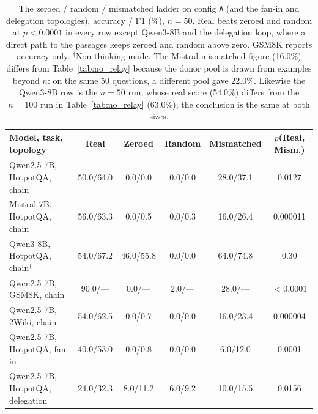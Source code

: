\documentclass[11pt]{article}
\begin{document}
\begin{table}[h]
\centering
\small
\caption{The zeroed / random / mismatched ladder on config \texttt{A} (and the
fan-in and delegation topologies), accuracy / F1 (\%), $n{=}50$. Real beats
zeroed and random at $p<0.0001$ in every row except Qwen3-8B and the
delegation loop, where a direct path to the passages keeps zeroed and random
above zero. GSM8K reports accuracy only. $^\dagger$Non-thinking mode. The Mistral
mismatched figure (16.0\%) differs from Table~\ref{tab:no_relay} because the donor
pool is drawn from examples beyond $n$: on the same 50 questions, a different pool
gave 22.0\%. Likewise the Qwen3-8B row is the $n{=}50$ run, whose real score
(54.0\%) differs from the $n{=}100$ run in Table~\ref{tab:no_relay} (63.0\%); the
conclusion is the same at both sizes.}
\label{tab:ladder}
\begin{tabular}{lccccc}
\toprule
\textbf{Model, task, topology} & \textcolor{realblue}{\textbf{Real}} & \textbf{Zeroed} & \textbf{Random} & \textcolor{wrongred}{\textbf{Mismatched}} & $p$(Real, Mism.) \\
\midrule
Qwen2.5-7B, HotpotQA, chain       & 50.0/64.0 & 0.0/0.0   & 0.0/0.0 & 28.0/37.1 & 0.0127 \\
Mistral-7B, HotpotQA, chain       & 56.0/63.3 & 0.0/0.5   & 0.0/0.3 & 16.0/26.4 & 0.000011 \\
Qwen3-8B, HotpotQA, chain$^\dagger$ & 54.0/67.2 & 46.0/55.8 & 0.0/0.0 & 64.0/74.8 & 0.30 \\
Qwen2.5-7B, GSM8K, chain          & 90.0/--- & 0.0/---   & 2.0/--- & 28.0/---  & $<$0.0001 \\
Qwen2.5-7B, 2Wiki, chain          & 54.0/62.5 & 0.0/0.7   & 0.0/0.0 & 16.0/23.4 & 0.000004 \\
Qwen2.5-7B, HotpotQA, fan-in      & 40.0/53.0 & 0.0/0.8   & 0.0/0.0 & 6.0/12.0  & 0.0001 \\
Qwen2.5-7B, HotpotQA, delegation  & 24.0/32.3 & 8.0/11.2  & 6.0/9.2 & 10.0/15.5 & 0.0156 \\
\bottomrule
\end{tabular}
\end{table}
\end{document}
